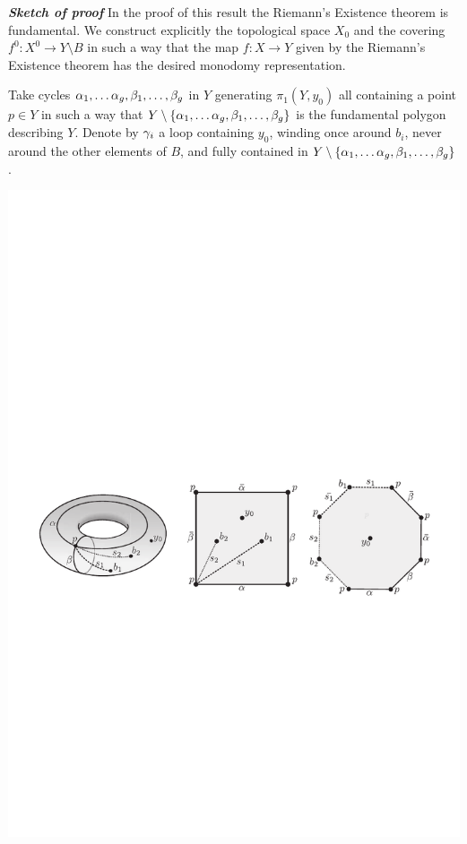 \documentclass[10pt,handout]{beamer} %
\begin{document}
\begin{frame}

\emph{\bf Sketch of proof}
	In the proof of this result the Riemann's Existence theorem is fundamental. We construct explicitly the topological space $X_0$ and the covering $f^0\colon X^0\to Y\setminus B$ in such a way that the map $f\colon X\to Y$ given by the Riemann's Existence theorem has the desired monodomy representation. 
	
	Take cycles $\alpha_1,\ldots\alpha_g,\beta_1,\ldots,\beta_g$ in $Y$ generating $\pi_1(Y,y_0)$ all containing a point $p\in Y$ in such a way that $Y\setminus\{\alpha_1,\ldots\alpha_g,\beta_1,\ldots,\beta_g\}$ is the fundamental polygon describing $Y$. Denote by $\gamma_i$ a loop containing $y_0$, winding once around $b_i$, never around the other elements of $B$, and fully contained in $Y\setminus\{\alpha_1,\ldots\alpha_g,\beta_1,\ldots,\beta_g\}$.
	
	\includegraphics[width=\textwidth]{../figures/CM-fig-7-6.pdf}
	
\end{frame}
\end{document}
